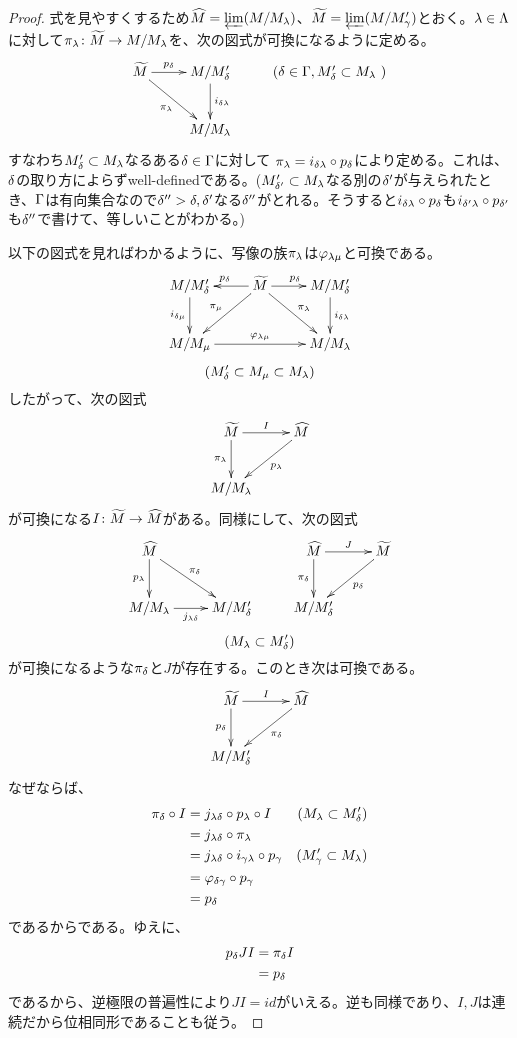 \begin{proof}
  式を見やすくするため$\widehat{M} = \operatorname*{\varprojlim} (M/M_{{\lambda}})$、$\widetilde{M} = \operatorname*{\varprojlim}(M/M'_{{\gamma}})$とおく。${\lambda} \in {\Lambda}$に対して$\pi_{{\lambda}} \colon \widetilde{M} \to M/M_{{\lambda}}$を、次の図式が可換になるように定める。
\[
\xymatrix{
\wt{M} \ar[r]^-{p_{\grd}} \ar[rd]_{\pi_{\grl}} & M/M'_{\grd} \ar[d]^{i_{\grd \grl}}  & \text{($\grd \in \grG, M'_{\grd} \subset M_{\grl}$ )} \\
{} & M/M_{\grl} & {}
}
\]
  すなわち$M'_{{\delta}} \subset M_{{\lambda}}$なるある${\delta} \in {\Gamma}$に対して
  $\pi_{{\lambda}} = i_{{\delta} {\lambda}} \circ p_{{\delta}}$により定める。これは、${\delta}$の取り方によらずwell-definedである。($M'_{{\delta}'} \subset M_{{\lambda}}$なる別の${\delta}'$が与えられたとき、${\Gamma}$は有向集合なので${\delta}''> {\delta}, {\delta}'$なる${\delta}''$がとれる。そうすると$ i_{{\delta} {\lambda}} \circ p_{{\delta}}$も$i_{{\delta}' {\lambda}} \circ p_{{\delta}'}$
  も${\delta}''$で書けて、等しいことがわかる。)

  以下の図式を見ればわかるように、写像の族$\pi_{{\lambda}}$は${\varphi}_{{\lambda} \mu}$と可換である。
  \[
  \xymatrix{
  M/M'_{\grd} \ar[d]_{i_{\grd \mu}} & \wt{M} \ar[dl]_{\pi_{\mu}} \ar[l]_{p_{\grd}} \ar[r]^{p_{\grd}} \ar[rd]^{\pi_{\grl}} & M/M'_{\grd} \ar[d]^-{i_{\grd \grl}} \\
  M/M_{\mu} \ar[rr]^-{\vp_{\grl \mu}} & {} & M/M_{\grl}
  }
  \]
  \[
  (M'_{{\delta}} \subset M_{\mu} \subset M_{{\lambda}})
  \]
したがって、次の図式
\[
\xymatrix{
\wt{M} \ar[d]_-{\pi_{\grl}} \ar[r]^I & \wh{M} \ar[dl]^-{p_{\grl}} \\
M/M_{\grl} & {}
}
\]
が可換になる$I \colon \widetilde{M} \to \widehat{M}$がある。同様にして、次の図式
\[
\xymatrix{
\wh{M} \ar[d]_-{p_{\grl}} \ar[rd]^-{\pi_{\grd}} & {} & \wh{M} \ar[d]_-{\pi_{\grd}} \ar[r]^J & \wt{M} \ar[dl]^-{p_{\grd}} \\
M/M_{\grl} \ar[r]_-{j_{\grl \grd}} & M/M'_{\grd} & M/M'_{\grd} & {}
}
\]
\[
(M_{{\lambda}} \subset M'_{{\delta}})
\]
が可換になるような$\pi_{{\delta}}$と$J$が存在する。このとき次は可換である。
\[
\xymatrix{
\wt{M} \ar[d]_-{p_{\grd}} \ar[r]^I & \wh{M} \ar[dl]^-{\pi_{\grd}} \\
M/M'_{\grd} & {}
}
\]
なぜならば、
\begin{align*}
  \pi_{{\delta}} \circ I &= j_{{\lambda} {\delta}} \circ p_{{\lambda}} \circ I &(M_{{\lambda}} \subset M'_{{\delta}}) \\
  &= j_{{\lambda} {\delta}} \circ \pi_{{\lambda}} \\
  &= j_{{\lambda} {\delta}} \circ i_{{\gamma} {\lambda}} \circ p_{{\gamma}} &(M'_{{\gamma}} \subset M_{{\lambda}}) \\
  &= {\varphi}_{{\delta} {\gamma}} \circ p_{{\gamma}} \\
  &= p_{{\delta}}
\end{align*}
であるからである。ゆえに、
\begin{align*}
  p_{{\delta}}JI &= \pi_{{\delta}} I \\
  &= p_{{\delta}}
\end{align*}
であるから、逆極限の普遍性により$JI = id$がいえる。逆も同様であり、$I,J$は連続だから位相同形であることも従う。

\end{proof}





